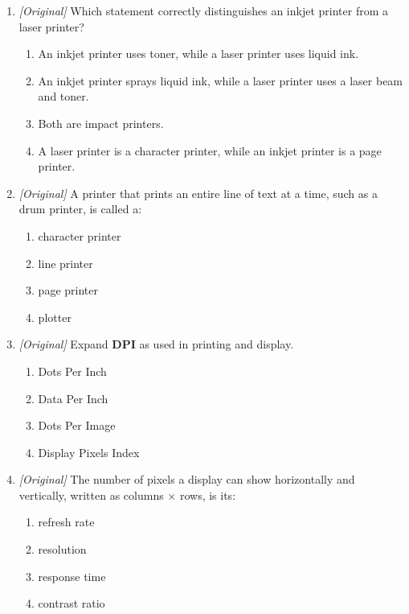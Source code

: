 \documentclass[11pt]{article}
\begin{document}
\begin{enumerate}[label=\textbf{Q\arabic*.}, leftmargin=*]
\begin{enumerate}[label=\Alph*.]
    \item Inkjet printer
    \item Plotter
    \item Laser printer
    \item Dot matrix printer
  \end{enumerate}
\item \textit{[Original]} Which statement correctly distinguishes an inkjet
  printer from a laser printer?
  \begin{enumerate}[label=\Alph*.]
    \item An inkjet printer uses toner, while a laser printer uses liquid
      ink.
    \item An inkjet printer sprays liquid ink, while a laser printer uses a
      laser beam and toner.
    \item Both are impact printers.
    \item A laser printer is a character printer, while an inkjet printer is
      a page printer.
  \end{enumerate}
\item \textit{[Original]} A printer that prints an entire line of text at a
  time, such as a drum printer, is called a:
  \begin{enumerate}[label=\Alph*.]
    \item character printer
    \item line printer
    \item page printer
    \item plotter
  \end{enumerate}
\item \textit{[Original]} Expand \textbf{DPI} as used in printing and display.
  \begin{enumerate}[label=\Alph*.]
    \item Dots Per Inch
    \item Data Per Inch
    \item Dots Per Image
    \item Display Pixels Index
  \end{enumerate}
\item \textit{[Original]} The number of pixels a display can show
  horizontally and vertically, written as columns $\times$ rows, is its:
  \begin{enumerate}[label=\Alph*.]
    \item refresh rate
    \item resolution
    \item response time
    \item contrast ratio

\end{enumerate}
\end{enumerate}
\end{document}
